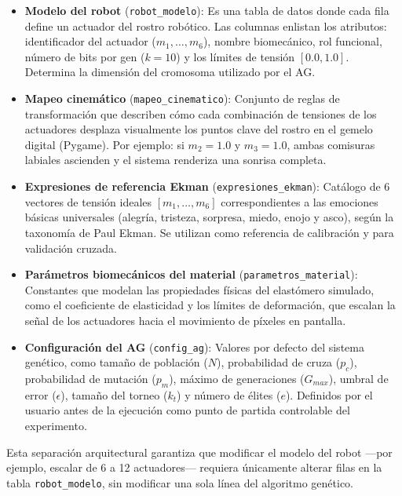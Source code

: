 \begin{itemize}
    \item \textbf{Modelo del robot} (\texttt{robot\_modelo}): Es una tabla de datos donde cada fila define un actuador del rostro robótico. Las columnas enlistan los atributos: identificador del actuador ($m_1, \dots, m_6$), nombre biomecánico, rol funcional, número de bits por gen ($k = 10$) y los límites de tensión $[0.0, 1.0]$. Determina la dimensión del cromosoma utilizado por el AG.
    \item \textbf{Mapeo cinemático} (\texttt{mapeo\_cinematico}): Conjunto de reglas de transformación que describen cómo cada combinación de tensiones de los actuadores desplaza visualmente los puntos clave del rostro en el gemelo digital (Pygame). Por ejemplo: si $m_2 = 1.0$ y $m_3 = 1.0$, ambas comisuras labiales ascienden y el sistema renderiza una sonrisa completa.
    \item \textbf{Expresiones de referencia Ekman} (\texttt{expresiones\_ekman}): Catálogo de 6 vectores de tensión ideales $[m_1, \dots, m_6]$ correspondientes a las emociones básicas universales (alegría, tristeza, sorpresa, miedo, enojo y asco), según la taxonomía de Paul Ekman. Se utilizan como referencia de calibración y para validación cruzada.
    \item \textbf{Parámetros biomecánicos del material} (\texttt{parametros\_material}): Constantes que modelan las propiedades físicas del elastómero simulado, como el coeficiente de elasticidad y los límites de deformación, que escalan la señal de los actuadores hacia el movimiento de píxeles en pantalla.
    \item \textbf{Configuración del AG} (\texttt{config\_ag}): Valores por defecto del sistema genético, como tamaño de población ($N$), probabilidad de cruza ($p_c$), probabilidad de mutación ($p_m$), máximo de generaciones ($G_{max}$), umbral de error ($\epsilon$), tamaño del torneo ($k_t$) y número de élites ($e$). Definidos por el usuario antes de la ejecución como punto de partida controlable del experimento.
\end{itemize}

Esta separación arquitectural garantiza que modificar el modelo del robot ---por ejemplo, escalar de 6 a 12 actuadores--- requiera únicamente alterar filas en la tabla \texttt{robot\_modelo}, sin modificar una sola línea del algoritmo genético.



